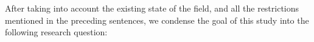After taking into account the existing state of the field, and all the restrictions mentioned in the preceding sentences, we condense the goal of this study into the following research question:








